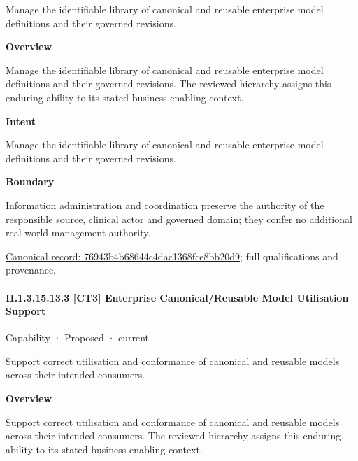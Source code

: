 Manage the identifiable library of canonical and reusable enterprise model definitions and their governed revisions.



\textbf{Overview}



Manage the identifiable library of canonical and reusable enterprise model definitions and their governed revisions. The reviewed hierarchy assigns this enduring ability to its stated business-enabling context.



\textbf{Intent}



Manage the identifiable library of canonical and reusable enterprise model definitions and their governed revisions.



\textbf{Boundary}



Information administration and coordination preserve the authority of the responsible source, clinical actor and governed domain; they confer no additional real-world management authority.


{\footnotesize \href{../../../../continuum/strategy/capability/76943b4b68644c4dac1368fce8bb20d9.md}{Canonical record: 76943b4b68644c4dac1368fce8bb20d9}; full qualifications and provenance.}\par
\paragraph*{II.1.3.15.13.3 [CT3] Enterprise Canonical/Reusable Model Utilisation Support}
\label{navigation:II.1.3.15.13.3}

\label{element:5744cb9d86494064af87afb3cbf2cf97}
{\small Capability · Proposed · current}\par

Support correct utilisation and conformance of canonical and reusable models across their intended consumers.



\textbf{Overview}



Support correct utilisation and conformance of canonical and reusable models across their intended consumers. The reviewed hierarchy assigns this enduring ability to its stated business-enabling context.



